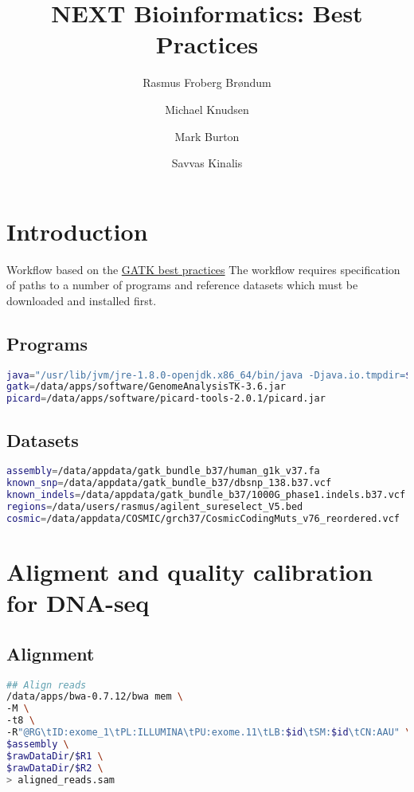\documentclass[10pt, a4paper]{report}
\title{NEXT Bioinformatics: Best Practices}
\author[1]{Rasmus Froberg Br\o ndum}
\author[2]{Michael Knudsen}
\author[3]{Mark Burton}
\author[4]{Savvas Kinalis}
\affil[1]{Department of Haematology, Aalborg University Hospital}
\affil[2]{MOMA}
\affil[3]{SDU}
\affil[4]{Rigshospitalet}
\begin{document}
\maketitle
\chapter{Introduction}
Workflow based on the \href{https://software.broadinstitute.org/gatk/best-practices/}{GATK best practices}
The workflow requires specification of paths to a number of programs and reference datasets which must be downloaded and installed first.
\section{Programs}
\begin{lstlisting}[language=bash]
java="/usr/lib/jvm/jre-1.8.0-openjdk.x86_64/bin/java -Djava.io.tmpdir=$TMPDIR" 
gatk=/data/apps/software/GenomeAnalysisTK-3.6.jar
picard=/data/apps/software/picard-tools-2.0.1/picard.jar
\end{lstlisting}

\section{Datasets}
\begin{lstlisting}[language=bash]
assembly=/data/appdata/gatk_bundle_b37/human_g1k_v37.fa
known_snp=/data/appdata/gatk_bundle_b37/dbsnp_138.b37.vcf
known_indels=/data/appdata/gatk_bundle_b37/1000G_phase1.indels.b37.vcf
regions=/data/users/rasmus/agilent_sureselect_V5.bed
cosmic=/data/appdata/COSMIC/grch37/CosmicCodingMuts_v76_reordered.vcf
\end{lstlisting}


\chapter{Aligment and quality calibration for DNA-seq}
\section{Alignment}

\begin{lstlisting}[language=bash]
## Align reads
/data/apps/bwa-0.7.12/bwa mem \
-M \
-t8 \
-R"@RG\tID:exome_1\tPL:ILLUMINA\tPU:exome.11\tLB:$id\tSM:$id\tCN:AAU" \
$assembly \
$rawDataDir/$R1 \
$rawDataDir/$R2 \
> aligned_reads.sam
\end{lstlisting}
\end{document}
